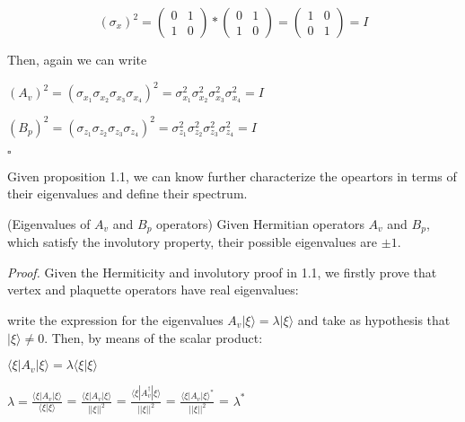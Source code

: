 \documentclass{Configuration_Files/PoliMi3i_thesis}
\begin{document}
\[
\text{$( \sigma_x )^{2}$} = 
\begin{pmatrix}
	0 & 1 \\
	1 & 0
\end{pmatrix} *
\begin{pmatrix}
	0 & 1 \\
	1 & 0
\end{pmatrix} =
\begin{pmatrix}
	1 & 0 \\
	0 & 1
\end{pmatrix}
= \text{$I$}
\]\newline


Then, again we can write \newline

\begin{center}
	$(A_v)^{2} = (\sigma_{x_1} \sigma_{x_2} \sigma_{x_3} \sigma_{x_4})^{2} = \sigma_{x_1}^2 \sigma_{x_2}^2 \sigma_{x_3}^2 \sigma_{x_4}^2 = I$ 
	
	$(B_p)^{2} = (\sigma_{z_1} \sigma_{z_2} \sigma_{z_3} \sigma_{z_4})^{2} = \sigma_{z_1}^2 \sigma_{z_2}^2 \sigma_{z_3}^2 \sigma_{z_4}^2 = I$
\end{center}

\hfill $\square$

Given proposition 1.1, we can know further characterize the opeartors in terms of their eigenvalues and define their spectrum.

\begin{proposition} (Eigenvalues of $A_v$ and $B_p$ operators) Given Hermitian operators $A_v$ and $B_p$, which satisfy the involutory property, their possible eigenvalues are $\pm 1$.
\end{proposition}


\textit{Proof.}\newline
Given the Hermiticity and involutory proof in 1.1, we firstly prove that vertex and plaquette operators have real eigenvalues: 

write the expression for the eigenvalues $A_v |\xi \rangle = \lambda |\xi \rangle$ and take as hypothesis that $|\xi \rangle \neq 0$. Then, by means of the scalar product:

\begin{center}
	$\langle \xi|A_v|\xi \rangle = \lambda \langle \xi | \xi \rangle$
	
	$\lambda = \frac {\langle \xi|A_v|\xi \rangle}{\langle \xi |\xi \rangle}$ = $\frac {\langle \xi|A_v|\xi \rangle}{||\xi||^2}$ = $\frac {\langle \xi|A_v^{\dagger}|\xi \rangle}{||\xi||^2}$ = $\frac {\langle \xi|A_v|\xi\rangle^*}{||\xi||^2}$ = $\lambda^*$ 
\end{center}
\end{document}
